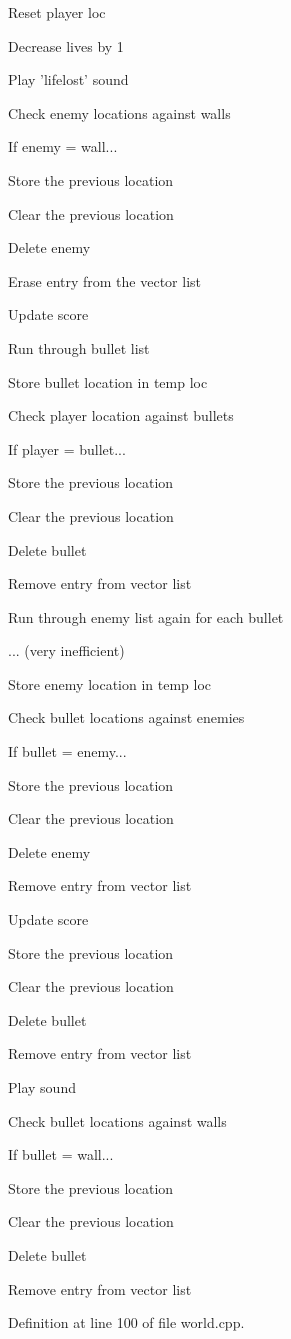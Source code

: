 Reset player loc

Decrease lives by 1

Play 'lifelost' sound

Check enemy locations against walls

If enemy = wall...

Store the previous location

Clear the previous location

Delete enemy

Erase entry from the vector list

Update score

Run through bullet list

Store bullet location in temp loc

Check player location against bullets

If player = bullet...

Store the previous location

Clear the previous location

Delete bullet

Remove entry from vector list

Run through enemy list again for each bullet

... (very inefficient)

Store enemy location in temp loc

Check bullet locations against enemies

If bullet = enemy...

Store the previous location

Clear the previous location

Delete enemy

Remove entry from vector list

Update score

Store the previous location

Clear the previous location

Delete bullet

Remove entry from vector list

Play sound

Check bullet locations against walls

If bullet = wall...

Store the previous location

Clear the previous location

Delete bullet

Remove entry from vector list 

Definition at line 100 of file world.\-cpp.

